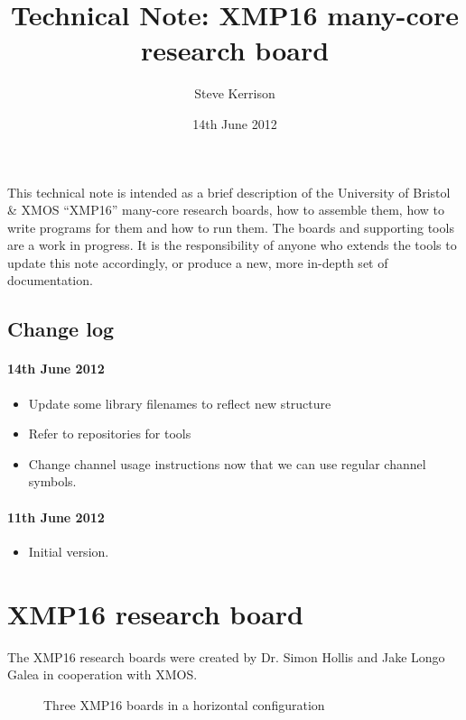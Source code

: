 \documentclass[12pt,a4paper,final,twoside]{article}
\begin{document}
\title{Technical Note: XMP16 many-core research board}
\author{Steve Kerrison}
\date{14th June 2012}
\maketitle

This technical note is intended as a brief description of the University of Bristol \& XMOS ``XMP16'' many-core research boards, how to assemble them, how to write programs for them and how to run them. The boards and supporting tools are a work in progress. It is the responsibility of anyone who extends the tools to update this note accordingly, or produce a new, more in-depth set of documentation.

\subsection{Change log}

\paragraph{14th June 2012}
\begin{itemize}
\item Update some library filenames to reflect new structure
\item Refer to repositories for tools
\item Change channel usage instructions now that we can use regular channel symbols.
\end{itemize}

\paragraph{11th June 2012}

\begin{itemize}
\item Initial version.
\end{itemize}

\section{XMP16 research board}

The XMP16 research boards were created by Dr. Simon Hollis and Jake Longo Galea in cooperation with XMOS.

\begin{figure}[htbp]
\centering
\setlength\fboxsep{0pt}
\setlength\fboxrule{1pt}
\caption{Three XMP16 boards in a horizontal configuration}
\end{figure}
\end{document}
